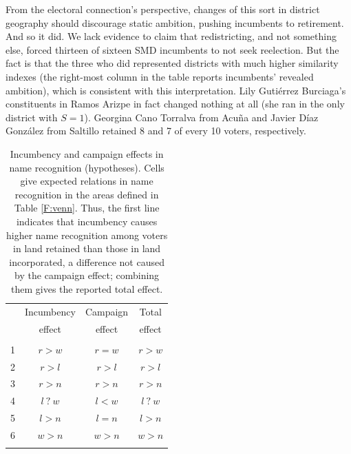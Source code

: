 \documentclass[letter,12pt]{article}
\begin{document}
From the electoral connection's perspective, changes of this sort in district geography should discourage static ambition, pushing incumbents to retirement. And so it did. We lack evidence to claim that redistricting, and not something else, forced thirteen of sixteen SMD incumbents to not seek reelection. But the fact is that the three who did represented districts with much higher similarity indexes (the right-most column in the table reports incumbents' revealed ambition), which is consistent with this interpretation. Lily Gutiérrez Burciaga's constituents in Ramos Arizpe in fact changed nothing at all (she ran in the only district with $S=1$). Georgina Cano Torralva from Acuña and Javier Díaz González from Saltillo retained 8 and 7 of every 10 voters, respectively.

\begin{table}
  \centering
  \begin{tabular}{cccc}
    & Incumbency & Campaign & Total   \\ [-.5ex]
    & effect     & effect   & effect  \\ \hline
    \\ [-1.2ex]
    1 & $r>w$    & $r=w$    & $r>w$   \\
    2 & $r>l$    & $r>l$    & $r>l$   \\
    3 & $r>n$    & $r>n$    & $r>n$   \\
    4 & $l~?~w$  & $l<w$    & $l~?~w$ \\
    5 & $l>n$    & $l=n$    & $l>n$   \\
    6 & $w>n$    & $w>n$    & $w>n$   \\ \\ [-1.2ex] \hline 
  \end{tabular}
  \caption{Incumbency and campaign effects in name recognition (hypotheses). Cells give expected relations in name recognition in the areas defined in Table \ref{F:venn}. Thus, the first line indicates that incumbency causes higher name recognition among voters in land retained than those in land incorporated, a difference not caused by the campaign effect; combining them gives the reported total effect.}\label{T:hyps}
\end{table}
\end{document}
